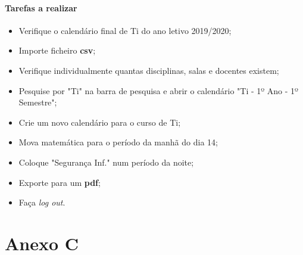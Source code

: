 \documentclass[11pt, twoside]{report}
\begin{document}
		\subsubsection*{Tarefas a realizar}	
	\begin{itemize}
		\item Verifique o calendário final de Ti do ano letivo 2019/2020;
		\item Importe ficheiro \textbf{csv};
		\item Verifique individualmente quantas disciplinas, salas e docentes existem;
		\item Pesquise por "Ti" na barra de pesquisa e abrir o calendário "Ti - 1º Ano - 1º Semestre";
		\item Crie um novo calendário para o curso de Ti;
		\item Mova matemática para o período da manhã do dia 14;
		\item Coloque "Segurança Inf." num período da noite;
		\item Exporte para um \textbf{pdf};
		\item Faça \textit{log out}.
	\end{itemize}

	
	\chapter*{Anexo C}
\end{document}
